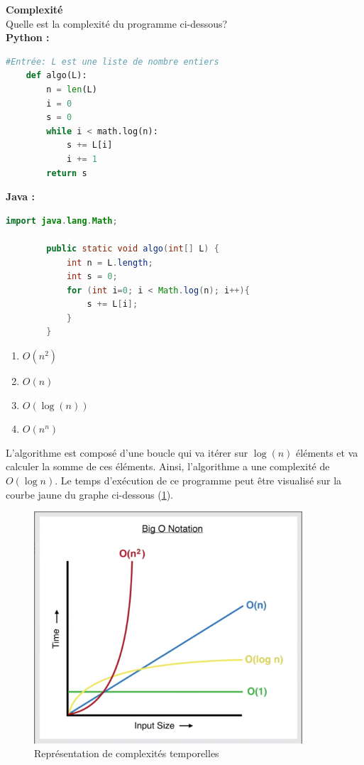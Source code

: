 \begin{Exercice}[10 minutes] \textbf{Complexité} \\
    Quelle est la complexité du programme ci-dessous?\\
    \textbf{Python :}
    \begin{lstlisting}[language=Python]
    #Entrée: L est une liste de nombre entiers
    def algo(L):
        n = len(L)
        i = 0
        s = 0
        while i < math.log(n):
            s += L[i]
            i += 1
        return s
    \end{lstlisting}
    
    \textbf{Java :}
    \begin{lstlisting}[language=Java]
        import java.lang.Math; 

        public static void algo(int[] L) {
            int n = L.length;
            int s = 0;
            for (int i=0; i < Math.log(n); i++){
                s += L[i];
            }
        } \end{lstlisting}

    \begin{enumerate}
        \item $O(n^2)$
        \item $O(n)$
        \item $O(\log(n))$
        \item $O(n^n)$
    \end{enumerate}

    \begin{solution}
    L'algorithme est composé d'une boucle qui va itérer sur $\log(n)$ éléments et 
    va calculer la somme de ces éléments. Ainsi, l'algorithme a une complexité de $O(\log n)$.
    Le temps d'exécution de ce programme peut être visualisé sur la courbe jaune du graphe ci-dessous (\ref{bigO}).
    \end{solution}
    
    \begin{figure}[h!]
        \centering
        \includegraphics[width=10cm]{ressources/complexity.png}
        \caption{Représentation de complexités temporelles}
        \label{bigO}
    \end{figure}

    

\end{Exercice}

